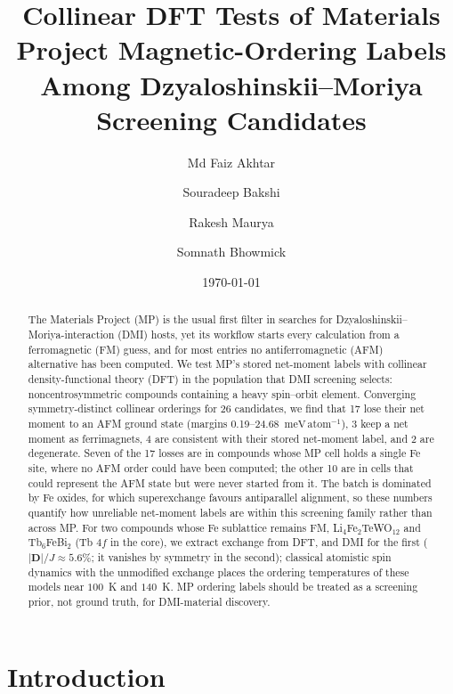 \documentclass[aps,prb,preprint,superscriptaddress,longbibliography,nofootinbib]{revtex4-2}
\newcommand{\meVat}{\ensuremath{\mathrm{meV\,atom^{-1}}}}
\begin{document}
\title{Collinear DFT Tests of Materials Project Magnetic-Ordering Labels Among Dzyaloshinskii--Moriya Screening Candidates}

\author{Md Faiz Akhtar}
\author{Souradeep Bakshi}
\author{Rakesh Maurya}
\author{Somnath Bhowmick}

\date{\today}

\begin{abstract}
The Materials Project (MP) is the usual first filter in searches for
Dzyaloshinskii--Moriya-interaction (DMI) hosts, yet its workflow starts every calculation from a
ferromagnetic (FM) guess, and for most entries no antiferromagnetic (AFM) alternative has been computed. We
test MP's stored net-moment labels with collinear density-functional theory (DFT) in the population that DMI
screening selects: noncentrosymmetric compounds containing a heavy spin--orbit element. Converging
symmetry-distinct collinear orderings for 26 candidates, we find that 17 lose their net moment to an AFM ground
state (margins 0.19--24.68~\meVat), 3 keep a net moment as ferrimagnets, 4 are consistent with their stored
net-moment label, and 2 are degenerate.
Seven of the 17 losses are in compounds whose MP cell holds a single Fe
site, where no AFM order could have been computed; the other 10 are in cells that could represent the AFM state
but were never started from it. The batch is dominated by Fe oxides, for which superexchange favours
antiparallel alignment, so these numbers quantify how unreliable net-moment labels are within this screening
family rather than across MP.
For two compounds whose Fe sublattice remains FM, Li$_4$Fe$_2$TeWO$_{12}$ and Tb$_6$FeBi$_2$ (Tb $4f$ in the
core), we extract exchange from DFT, and DMI for the first ($|\mathbf{D}|/J\approx5.6\%$; it vanishes by symmetry
in the second); classical atomistic spin dynamics with the
unmodified exchange places the ordering temperatures of these models near $100$~K and $140$~K. MP ordering labels
should be treated as a screening prior, not ground truth, for DMI-material discovery.
\end{abstract}

\maketitle

\linenumbers

\section*{Introduction}
\end{document}
